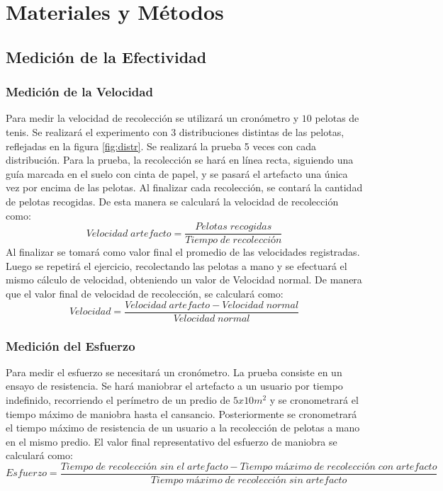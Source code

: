 \section*{Materiales y Métodos}

\subsection*{Medición de la Efectividad}

\subsubsection{Medición de la Velocidad}
Para medir la velocidad de recolección se utilizará un cronómetro y $10$ pelotas de tenis. Se realizará el experimento con $3$ distribuciones distintas de las pelotas, reflejadas en la figura \ref{fig:distr}. Se realizará la prueba 5 veces con cada distribución. Para la prueba, la recolección se hará en línea recta, siguiendo una guía marcada en el suelo con cinta de papel, y se pasará el artefacto una única vez por encima de las pelotas. Al finalizar cada recolección, se contará la cantidad de pelotas recogidas. De esta manera se calculará la velocidad de recolección como:
\vspace{5mm}
\begin{equation}
  Velocidad\;artefacto = \frac{Pelotas\;recogidas}{Tiempo\;de\;recolección}
\end{equation}
\vspace{5mm}
Al finalizar se tomará como valor final el promedio de las velocidades registradas. Luego se repetirá el ejercicio, recolectando las pelotas a mano y se efectuará el mismo cálculo de velocidad, obteniendo un valor de Velocidad normal. De manera que el valor final de velocidad de recolección, se calculará como:
\vspace{3mm}
\begin{equation}
  Velocidad = \frac{Velocidad\;artefacto - Velocidad\;normal}{Velocidad\;normal}
\end{equation}
\vspace{5mm}
\subsubsection{Medición del Esfuerzo}
Para medir el esfuerzo se necesitará un cronómetro. La prueba consiste en un ensayo de resistencia. Se hará maniobrar el artefacto a un usuario por tiempo indefinido, recorriendo el perímetro de un predio de $5x10 m^2$ y se cronometrará el tiempo máximo de maniobra hasta el cansancio. Posteriormente se cronometrará el tiempo máximo de resistencia de un usuario a la recolección de pelotas a mano en el mismo predio. El valor final representativo del esfuerzo de maniobra se calculará como:
\vspace{5mm}
\begin{equation}
  Esfuerzo =\frac{Tiempo\;de\;recolección\;sin\;el\;artefacto - Tiempo\;máximo\;de\;recolección\;con\;artefacto}{Tiempo\;máximo\;de\;recolección\;sin\;artefacto}
\end{equation}
\vspace{5mm}

